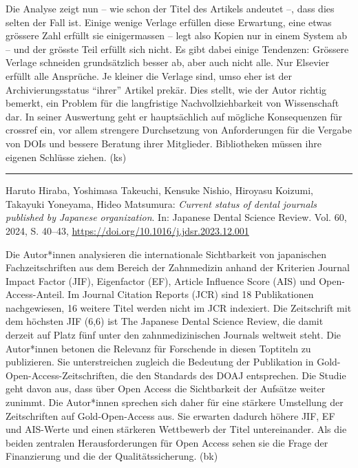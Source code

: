 \documentclass[a4paper,
fontsize=11pt,
oneside,
numbers=noperiodatend,
parskip=half-,
bibliography=totoc,
final
]{scrartcl}
\begin{document}
Die Analyse zeigt nun -- wie schon der Titel des Artikels andeutet --,
dass dies selten der Fall ist. Einige wenige Verlage erfüllen diese
Erwartung, eine etwas grössere Zahl erfüllt sie einigermassen -- legt
also Kopien nur in einem System ab -- und der grösste Teil erfüllt sich
nicht. Es gibt dabei einige Tendenzen: Grössere Verlage schneiden
grundsätzlich besser ab, aber auch nicht alle. Nur Elsevier erfüllt alle
Ansprüche. Je kleiner die Verlage sind, umso eher ist der
Archivierungsstatus \enquote{ihrer} Artikel prekär. Dies stellt, wie der
Autor richtig bemerkt, ein Problem für die langfristige
Nachvollziehbarkeit von Wissenschaft dar. In seiner Auswertung geht er
hauptsächlich auf mögliche Konsequenzen für crossref ein, vor allem
strengere Durchsetzung von Anforderungen für die Vergabe von DOIs und
bessere Beratung ihrer Mitglieder. Bibliotheken müssen ihre eigenen
Schlüsse ziehen. (ks)

\begin{center}\rule{0.5\linewidth}{0.5pt}\end{center}

Haruto Hiraba, Yoshimasa Takeuchi, Kensuke Nishio, Hiroyasu Koizumi,
Takayuki Yoneyama, Hideo Matsumura: \emph{Current status of dental
journals published by Japanese organization}. In: Japanese Dental
Science Review. Vol. 60, 2024, S. 40--43,
\url{https://doi.org/10.1016/j.jdsr.2023.12.001}

Die Autor*innen analysieren die internationale Sichtbarkeit von
japanischen Fachzeitschriften aus dem Bereich der Zahnmedizin anhand der
Kriterien Journal Impact Factor (JIF), Eigenfactor (EF), Article
Influence Score (AIS) und Open-Access-Anteil. Im Journal Citation
Reports (JCR) sind 18 Publikationen nachgewiesen, 16 weitere Titel
werden nicht im JCR indexiert. Die Zeitschrift mit dem höchsten JIF
(6,6) ist The Japanese Dental Science Review, die damit derzeit auf
Platz fünf unter den zahnmedizinischen Journals weltweit steht. Die
Autor*innen betonen die Relevanz für Forschende in diesen Toptiteln zu
publizieren. Sie unterstreichen zugleich die Bedeutung der Publikation
in Gold-Open-Access-Zeitschriften, die den Standards des DOAJ
entsprechen. Die Studie geht davon aus, dass über Open Access die
Sichtbarkeit der Aufsätze weiter zunimmt. Die Autor*innen sprechen sich
daher für eine stärkere Umstellung der Zeitschriften auf
Gold-Open-Access aus. Sie erwarten dadurch höhere JIF, EF und AIS-Werte
und einen stärkeren Wettbewerb der Titel untereinander. Als die beiden
zentralen Herausforderungen für Open Access sehen sie die Frage der
Finanzierung und die der Qualitätssicherung. (bk)
\end{document}
